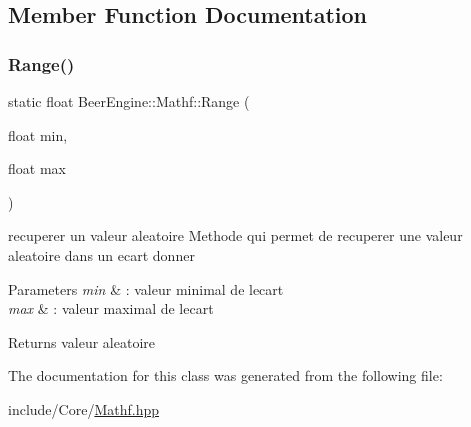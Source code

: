 \subsection{Member Function Documentation}
\mbox{\label{class_beer_engine_1_1_mathf_a857806a2b256303e5a737c6143e35454}} 
\subsubsection{\texorpdfstring{Range()}{Range()}}
{\footnotesize\ttfamily static float Beer\+Engine\+::\+Mathf\+::\+Range (\begin{DoxyParamCaption}\item[{float}]{min,  }\item[{float}]{max }\end{DoxyParamCaption})\hspace{0.3cm}{\ttfamily [static]}}



recuperer un valeur aleatoire Methode qui permet de recuperer une valeur aleatoire dans un ecart donner 


\begin{DoxyParams}{Parameters}
{\em min} & \+: valeur minimal de l\textquotesingle{}ecart \\
\hline
{\em max} & \+: valeur maximal de l\textquotesingle{}ecart \\
\hline
\end{DoxyParams}
\begin{DoxyReturn}{Returns}
valeur aleatoire 
\end{DoxyReturn}


The documentation for this class was generated from the following file\+:\begin{DoxyCompactItemize}
\item 
include/\+Core/\mbox{\hyperlink{_mathf_8hpp}{Mathf.\+hpp}}\end{DoxyCompactItemize}
